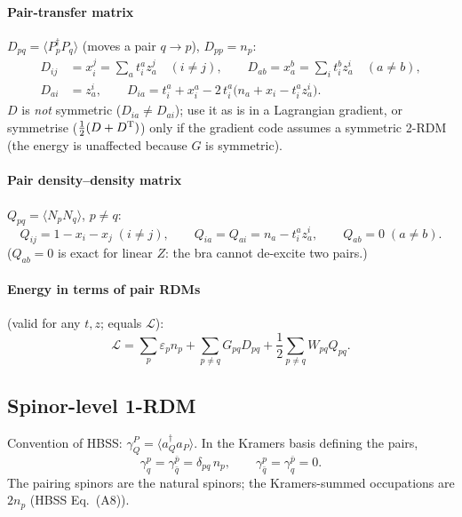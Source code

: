 \documentclass[11pt,a4paper]{article}
\newcommand{\kb}[1]{\bar{#1}}                 %
\newcommand{\Pd}[1]{P^{\dagger}_{#1}}
\newcommand{\Pa}[1]{P_{#1}}
\newcommand{\ev}[1]{\langle #1 \rangle}
\begin{document}
\paragraph{Pair-transfer matrix} $D_{pq}=\ev{\Pd p\Pa q}$ (moves a pair $q\to p$), $D_{pp}=n_p$:
\begin{equation}
  \boxed{
  \begin{aligned}
  D_{ij}&=x^j_i=\sum_a t^a_i z^j_a\quad(i\neq j), \qquad
  D_{ab}=x^b_a=\sum_i t^b_i z^i_a\quad(a\neq b),\\
  D_{ai}&=z^i_a,\qquad
  D_{ia}=t^a_i+x^a_i-2\,t^a_i\bigl(n_a+x_i-t^a_i z^i_a\bigr).
  \end{aligned}}
\end{equation}
$D$ is \emph{not} symmetric ($D_{ia}\neq D_{ai}$); use it as is in a Lagrangian gradient, or
symmetrise ($\tfrac12(D+D^{\rm T})$) only if the gradient code assumes a symmetric 2-RDM
(the energy is unaffected because $G$ is symmetric).

\paragraph{Pair density--density matrix} $Q_{pq}=\ev{N_pN_q}$, $p\neq q$:
\begin{equation}
  \boxed{\;
  Q_{ij}=1-x_i-x_j\;(i\neq j),\qquad Q_{ia}=Q_{ai}=n_a-t^a_i z^i_a,\qquad Q_{ab}=0\;(a\neq b).\;}
\end{equation}
($Q_{ab}=0$ is exact for linear $Z$: the bra cannot de-excite two pairs.)

\paragraph{Energy in terms of pair RDMs} (valid for any $t,z$; equals $\mathcal L$):
\begin{equation}
  \mathcal L=\sum_p\varepsilon_p n_p+\sum_{p\neq q}G_{pq}D_{pq}+\frac12\sum_{p\neq q}W_{pq}Q_{pq}.
  \label{eq:Epair}
\end{equation}

\subsection{Spinor-level 1-RDM}

Convention of HBSS: $\gamma^P_Q=\ev{a^\dagger_Q a_P}$. In the Kramers basis defining the pairs,
\begin{equation}
  \gamma^{p}_{q}=\gamma^{\kb p}_{\kb q}=\delta_{pq}\,n_p,\qquad \gamma^{p}_{\kb q}=\gamma^{\kb p}_{q}=0 .
\end{equation}
The pairing spinors are the natural spinors; the Kramers-summed occupations are $2n_p$
(HBSS Eq.~(A8)).
\end{document}
